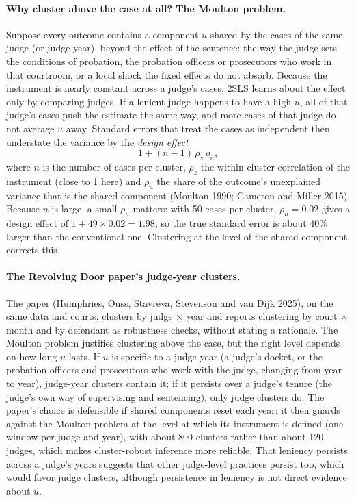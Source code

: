 \documentclass[11pt]{article}
\begin{document}
\paragraph{Why cluster above the case at all? The Moulton problem.} Suppose every outcome contains a component $u$ shared by the cases of the same judge (or judge-year), beyond the effect of the sentence: the way the judge sets the conditions of probation, the probation officers or prosecutors who work in that courtroom, or a local shock the fixed effects do not absorb. Because the instrument is nearly constant across a judge's cases, 2SLS learns about the effect only by comparing judges. If a lenient judge happens to have a high $u$, all of that judge's cases push the estimate the same way, and more cases of that judge do not average $u$ away. Standard errors that treat the cases as independent then understate the variance by the \emph{design effect}
\begin{equation*}
1 + (n - 1)\,\rho_z\,\rho_u,
\end{equation*}
where $n$ is the number of cases per cluster, $\rho_z$ the within-cluster correlation of the instrument (close to 1 here) and $\rho_u$ the share of the outcome's unexplained variance that is the shared component (Moulton 1990; Cameron and Miller 2015). Because $n$ is large, a small $\rho_u$ matters: with 50 cases per cluster, $\rho_u = 0.02$ gives a design effect of $1 + 49 \times 0.02 = 1.98$, so the true standard error is about 40\% larger than the conventional one. Clustering at the level of the shared component corrects this.

\paragraph{The Revolving Door paper's judge-year clusters.} The paper (Humphries, Ouss, Stavreva, Stevenson and van Dijk 2025), on the same data and courts, clusters by judge $\times$ year and reports clustering by court $\times$ month and by defendant as robustness checks, without stating a rationale. The Moulton problem justifies clustering above the case, but the right level depends on how long $u$ lasts. If $u$ is specific to a judge-year (a judge's docket, or the probation officers and prosecutors who work with the judge, changing from year to year), judge-year clusters contain it; if it persists over a judge's tenure (the judge's own way of supervising and sentencing), only judge clusters do. The paper's choice is defensible if shared components reset each year: it then guards against the Moulton problem at the level at which its instrument is defined (one window per judge and year), with about 800 clusters rather than about 120 judges, which makes cluster-robust inference more reliable. That leniency persists across a judge's years suggests that other judge-level practices persist too, which would favor judge clusters, although persistence in leniency is not direct evidence about $u$.
\end{document}
